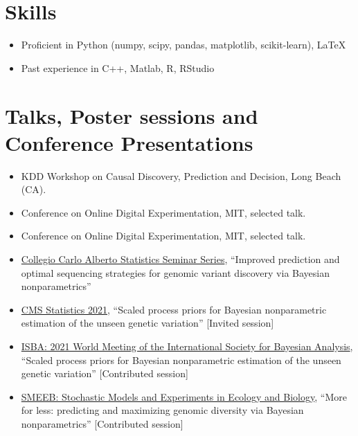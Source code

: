 \documentclass[10pt, a4paper]{article}
\newcommand{\years}[1]{\marginnote{\scriptsize #1}}
\begin{document}
\section*{Skills}
\begin{itemize}
	\item Proficient in Python (numpy, scipy, pandas, matplotlib, scikit-learn), \LaTeX
	\item Past experience in C++, Matlab, R, RStudio
\end{itemize}
\section*{Talks, Poster sessions and Conference Presentations}
\years{2023}
\begin{itemize}
	\item KDD Workshop on Causal Discovery, Prediction and Decision, Long Beach (CA).
	\item Conference on Online Digital Experimentation, MIT, selected talk.
\end{itemize}
\years{2022}
\begin{itemize}
	\item Conference on Online Digital Experimentation, MIT, selected talk.
\end{itemize}
\years{2021}
\begin{itemize}
	\item \href{https://www.carloalberto.org/event/lorenzo-masoero-amazon/}{Collegio Carlo Alberto Statistics Seminar Series}, ``{Improved prediction and optimal sequencing strategies for genomic variant discovery via Bayesian nonparametrics}''  
	\item \href{http://www.cmstatistics.org/CMStatistics2021/speakers.php}{CMS Statistics 2021}, ``{Scaled process priors for Bayesian nonparametric
estimation of the unseen genetic variation}'' [Invited session] 
	\item \href{https://events.stat.uconn.edu/ISBA2021/}{ISBA: 2021 World Meeting of the International Society for Bayesian Analysis}, ``{Scaled process priors for Bayesian nonparametric
estimation of the unseen genetic variation}'' [Contributed session] 
	\item \href{https://liphlab.github.io/SMEEB2021/}{SMEEB: Stochastic Models and Experiments in Ecology and Biology}, ``{More for less: predicting and maximizing genomic diversity via Bayesian nonparametrics}'' [Contributed session] 
\end{itemize}
\end{document}
